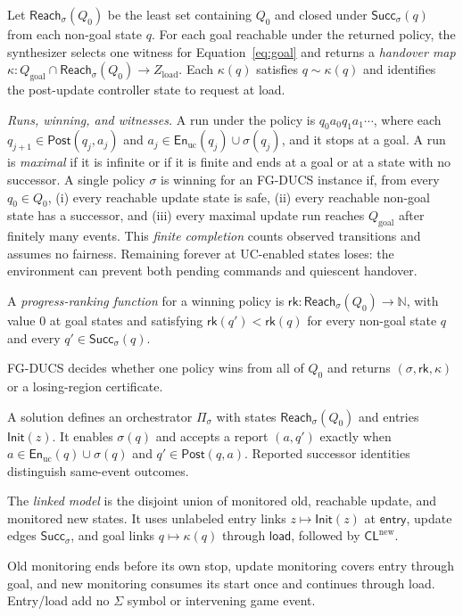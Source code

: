 \documentclass[acmsmall,screen,review,anonymous]{acmart}
\newcommand{\Post}{\mathsf{Post}}
\newcommand{\Goal}{Q_{\mathrm{goal}}}
\newcommand{\rank}{\mathsf{rk}}
\newcommand{\Init}{\mathsf{Init}}
\newcommand{\Reach}{\mathsf{Reach}}
\newcommand{\SuccSet}{\mathsf{Succ}}
\newcommand{\En}{\mathsf{En}}
\newcommand{\CLnew}{\mathsf{CL}^{\mathrm{new}}}
\begin{document}
\begin{definition}
Let $\Reach_\sigma(Q_0)$ be the least set containing $Q_0$ and closed under
$\SuccSet_\sigma(q)$ from each non-goal state $q$. For each goal reachable under the returned policy, the synthesizer selects one witness for Equation~\eqref{eq:goal} and returns a \emph{handover map} $\kappa:\Goal\cap\Reach_\sigma(Q_0)\to Z_{\mathrm{load}}$.
Each $\kappa(q)$ satisfies $q\sim\kappa(q)$ and identifies the post-update controller state to request at load.

\emph{Runs, winning, and witnesses.}
A run under the policy is $q_0a_0q_1a_1\cdots$, where each $q_{j+1}\in\Post(q_j,a_j)$ and
$a_j\in\En_{\mathrm{uc}}(q_j)\cup\sigma(q_j)$, and it stops at a goal. A run is \emph{maximal} if it is infinite or if it is finite and ends at a goal or at a state with no successor. A single policy $\sigma$ is winning for an FG-DUCS instance if, from every $q_0\in Q_0$,
(i) every reachable update state is safe, (ii) every reachable non-goal state has a successor, and
(iii) every maximal update run reaches $\Goal$ after finitely many events.
This \emph{finite completion} counts observed transitions and assumes no fairness. Remaining forever at UC-enabled states loses: the environment can prevent both pending commands and quiescent handover.

A \emph{progress-ranking function} for a winning policy is $\rank:\Reach_\sigma(Q_0)\to\mathbb N$, with value 0 at goal states and satisfying $\rank(q')<\rank(q)$ for every non-goal state $q$ and every
$q'\in \SuccSet_\sigma(q)$.

FG-DUCS decides whether one policy wins from all of $Q_0$ and returns $(\sigma,\rank,\kappa)$ or a losing-region certificate.
\end{definition}

\begin{definition}
\label{def:link}
A solution defines an orchestrator $\Pi_\sigma$ with states $\Reach_\sigma(Q_0)$ and entries $\Init(z)$. It enables $\sigma(q)$ and accepts a report $(a,q')$ exactly when $a\in\En_{\mathrm{uc}}(q)\cup\sigma(q)$ and $q'\in\Post(q,a)$. Reported successor identities distinguish same-event outcomes.

The \emph{linked model} is the disjoint union of monitored old, reachable update, and monitored new states. It uses unlabeled entry links $z\mapsto\Init(z)$ at $\mathsf{entry}$, update edges $\SuccSet_\sigma$, and goal links $q\mapsto\kappa(q)$ through $\mathsf{load}$, followed by $\CLnew$.

Old monitoring ends before its own stop, update monitoring covers entry through goal, and new monitoring consumes its start once and continues through load. Entry/load add no $\Sigma$ symbol or intervening game event.
\end{definition}
\end{document}
